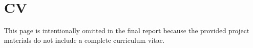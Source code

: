 \chapter*{CV}

This page is intentionally omitted in the final report because the provided project materials do not include a complete curriculum vitae.



\clearpage
